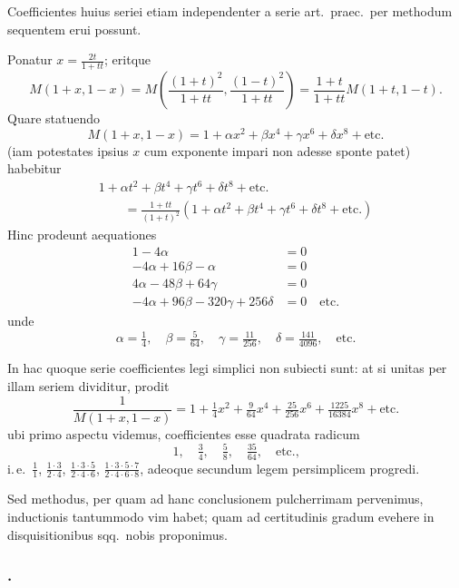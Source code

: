 \documentclass[12pt,a4paper]{article}
\begin{document}
Coefficientes huius seriei etiam independenter a serie art.\ praec.\ per methodum sequentem erui possunt.

Ponatur $x = \frac{2t}{1+tt}$; eritque
\[
M(1+x, 1-x) = M\left(\frac{(1+t)^2}{1+tt}, \frac{(1-t)^2}{1+tt}\right) = \frac{1+t}{1+tt}M(1+t, 1-t).
\]
Quare statuendo
\[
M(1+x, 1-x) = 1 + \alpha x^2 + \beta x^4 + \gamma x^6 + \delta x^8 + \text{etc.}
\]
(iam potestates ipsius $x$ cum exponente impari non adesse sponte patet) habebitur
\[
\begin{aligned}
1 + \alpha t^2 + \beta t^4 + \gamma t^6 + \delta t^8 + \text{etc.} \\
\qquad = \frac{1+tt}{(1+t)^2}\left(1 + \alpha t^2 + \beta t^4 + \gamma t^6 + \delta t^8 + \text{etc.}\right)
\end{aligned}
\]
Hinc prodeunt aequationes
\[
\begin{aligned}
1 - 4\alpha &= 0 \\
-4\alpha + 16\beta - \alpha &= 0 \\
4\alpha - 48\beta + 64\gamma &= 0 \\
-4\alpha + 96\beta - 320\gamma + 256\delta &= 0 \quad\text{etc.}
\end{aligned}
\]
unde
\[
\alpha = \tfrac{1}{4}, \quad \beta = \tfrac{5}{64}, \quad \gamma = \tfrac{11}{256}, \quad \delta = \tfrac{141}{4096}, \quad\text{etc.}
\]

In hac quoque serie coefficientes legi simplici non subiecti sunt: at si unitas per illam seriem dividitur, prodit
\[
\frac{1}{M(1+x,1-x)} = 1 + \tfrac{1}{4}x^2 + \tfrac{9}{64}x^4 + \tfrac{25}{256}x^6 + \tfrac{1225}{16384}x^8 + \text{etc.}
\]
ubi primo aspectu videmus, coefficientes esse quadrata radicum
\[
1, \quad \tfrac{3}{4}, \quad \tfrac{5}{8}, \quad \tfrac{35}{64}, \quad\text{etc.,}
\]
i.\,e.\ $\frac{1}{1}$, $\frac{1\cdot 3}{2\cdot 4}$, $\frac{1\cdot 3\cdot 5}{2\cdot 4\cdot 6}$, $\frac{1\cdot 3\cdot 5\cdot 7}{2\cdot 4\cdot 6\cdot 8}$, adeoque secundum legem persimplicem progredi.

Sed methodus, per quam ad hanc conclusionem pulcherrimam pervenimus, inductionis tantummodo vim habet; quam ad certitudinis gradum evehere in disquisitionibus sqq.\ nobis proponimus.

\subsubsection*{.}
\end{document}
